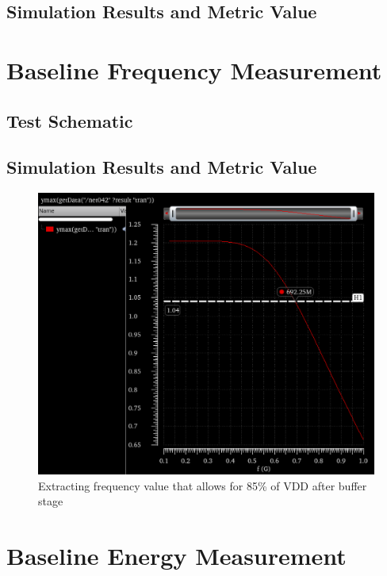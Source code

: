 \documentclass[12pt]{article}
\begin{document}
\newpage

\subsection{Simulation Results and Metric Value}



\newpage

\section{Baseline Frequency Measurement}
\subsection{Test Schematic}



\newpage

\subsection{Simulation Results and Metric Value}





\begin{figure}[H]
    \centering
    \includegraphics[width=0.75\linewidth]{writeup//figures/max_frequencies.png}
    \caption{Extracting frequency value that allows for 85\% of VDD after buffer stage}
\end{figure}

\newpage

\section{Baseline Energy Measurement}
\end{document}

